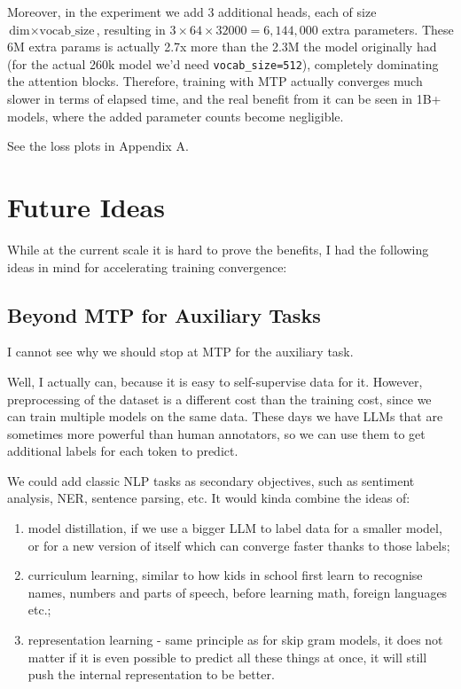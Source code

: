 \documentclass[10pt]{article}
\begin{document}
Moreover, in the experiment we add 3 additional heads, each of size $\text{dim} \times \text{vocab\_size}$, resulting in $3 \times 64 \times 32000 = 6,144,000$ extra parameters. These 6M extra params is actually 2.7x more than the 2.3M the model originally had (for the actual 260k model we'd need \texttt{vocab\_size=512}), completely dominating the attention blocks. Therefore, training with MTP actually converges much slower in terms of elapsed time, and the real benefit from it can be seen in 1B+ models, where the added parameter counts become negligible.

See the loss plots in Appendix A.

\section{Future Ideas}

While at the current scale it is hard to prove the benefits, I had the following ideas in mind for accelerating training convergence:

\subsection{Beyond MTP for Auxiliary Tasks}

I cannot see why we should stop at MTP for the auxiliary task.

Well, I actually can, because it is easy to self-supervise data for it. However, preprocessing of the dataset is a different cost than the training cost, since we can train multiple models on the same data. These days we have LLMs that are sometimes more powerful than human annotators, so we can use them to get additional labels for each token to predict.

We could add classic NLP tasks as secondary objectives, such as sentiment analysis, NER, sentence parsing, etc. It would kinda combine the ideas of:
\begin{enumerate}[leftmargin=*,itemsep=0pt,topsep=0pt,parsep=0pt]
    \item model distillation, if we use a bigger LLM to label data for a smaller model, or for a new version of itself which can converge faster thanks to those labels;
    \item curriculum learning, similar to how kids in school first learn to recognise names, numbers and parts of speech, before learning math, foreign languages etc.;
    \item representation learning - same principle as for skip gram models, it does not matter if it is even possible to predict all these things at once, it will still push the internal representation to be better.
\end{enumerate}
\end{document}
